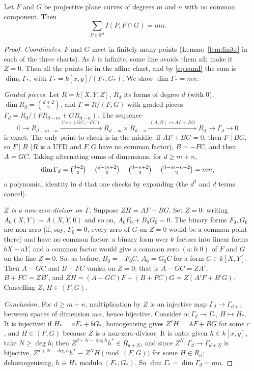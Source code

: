 \begin{theorem}[B\'ezout]\label{thm:bezout}
Let $F$ and $G$ be projective plane curves of degrees $m$ and $n$ with no common component. Then
\[
\sum_{P\in\mathbb P^2}I(P,F\cap G)=mn.
\]
\end{theorem}
\begin{proof}
\emph{Coordinates.} $F$ and $G$ meet in finitely many points (Lemma~\ref{lem:finite} in each of the three charts). As $k$ is infinite, some line
avoids them all; make it $Z=0$. Then all the points lie in the affine chart, and by \eqref{eq:sumI} the sum is $\dim_k\Gamma_*$, with
$\Gamma_*=k[x,y]/(F_*,G_*)$. We show $\dim\Gamma_*=mn$.

\emph{Graded pieces.} Let $R=k[X,Y,Z]$, $R_d$ its forms of degree $d$ (with $0$), $\dim R_d=\binom{d+2}2$, and $\Gamma=R/(F,G)$ with graded pieces
$\Gamma_d=R_d/(FR_{d-m}+GR_{d-n})$. The sequence
\[
0\to R_{d-m-n}\xrightarrow{\;C\mapsto(GC,-FC)\;}R_{d-m}\times R_{d-n}\xrightarrow{\;(A,B)\mapsto AF+BG\;}R_d\to\Gamma_d\to0
\]
is exact. The only point to check is in the middle: if $AF+BG=0$, then $F\mid BG$, so $F\mid B$ ($R$ is a UFD and $F,G$ have no common factor),
$B=-FC$, and then $A=GC$. Taking alternating sums of dimensions, for $d\ge m+n$,
\[
\dim\Gamma_d=\tbinom{d+2}2-\tbinom{d-m+2}2-\tbinom{d-n+2}2+\tbinom{d-m-n+2}2=mn,
\]
a polynomial identity in $d$ that one checks by expanding (the $d^2$ and $d$ terms cancel).

\emph{$Z$ is a non-zero-divisor on $\Gamma$.} Suppose $ZH=AF+BG$. Set $Z=0$: writing $A_0(X,Y)=A(X,Y,0)$ and so on, $A_0F_0+B_0G_0=0$. The binary
forms $F_0,G_0$ are non-zero (if, say, $F_0=0$, every zero of $G$ on $Z=0$ would be a common point there) and have no common factor: a binary form over $k$ factors into linear forms $bX-aY$, and a common factor would give a common zero
$(a:b:0)$ of $F$ and $G$ on the line $Z=0$. So, as before, $B_0=-F_0C$, $A_0=G_0C$ for a form $C\in k[X,Y]$. Then $A-GC$ and $B+FC$ vanish on $Z=0$,
that is $A-GC=ZA'$, $B+FC=ZB'$, and $ZH=(A-GC)F+(B+FC)G=Z(A'F+B'G)$. Cancelling $Z$, $H\in(F,G)$.

\emph{Conclusion.} For $d\ge m+n$, multiplication by $Z$ is an injective map $\Gamma_d\to\Gamma_{d+1}$ between spaces of dimension $mn$, hence
bijective. Consider $\alpha:\Gamma_d\to\Gamma_*$, $H\mapsto H_*$. It is injective: if $H_*=aF_*+bG_*$, homogenising gives $Z^rH=AF+BG$ for some $r$,
and $H\in(F,G)$ because $Z$ is a non-zero-divisor. It is onto: given $h\in k[x,y]$, take $N\ge\deg h$; then $Z^{d+N-\deg h}h^*\in R_{d+N}$, and since $Z^N:\Gamma_d\to\Gamma_{d+N}$ is
bijective, $Z^{d+N-\deg h}h^*\equiv Z^NH\pmod{(F,G)}$ for some $H\in R_d$; dehomogenising, $h\equiv H_*$ modulo $(F_*,G_*)$. So $\dim\Gamma_*=\dim\Gamma_d=mn$.
\end{proof}

